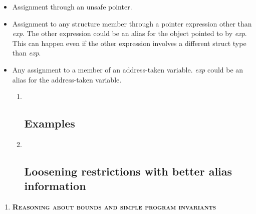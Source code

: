 \documentclass[]{article}
\begin{document}
\begin{itemize}
\item
  Assignment through an unsafe pointer.
\item
  Assignment to any structure member through a pointer expression other
  than \emph{exp}. The other expression could be an alias for the object
  pointed to by \emph{exp}. This can happen even if the other expression
  involves a different struct type than \emph{exp}.
\item
  Any assignment to a member of an address-taken variable. \emph{exp}
  could be an alias for the address-taken variable.

  \begin{enumerate}
  \def\labelenumi{\arabic{enumi}.}
  \item ~
    \subsection{\texorpdfstring{\protect\hypertarget{ux5fToc420589209}{}{\protect\hypertarget{ux5fToc422907000}{}{\protect\hypertarget{ux5fToc424307729}{}{\protect\hypertarget{ux5fToc426641106}{}{\protect\hypertarget{ux5fToc435434988}{}{\protect\hypertarget{ux5fToc437460821}{}{\protect\hypertarget{ux5fToc440445502}{}{\protect\hypertarget{ux5fToc440449284}{}{\protect\hypertarget{ux5fToc440551934}{}{}}}}}}}}}Examples}{Examples}}\label{examples-1}
  \item ~
    \subsection{\texorpdfstring{\protect\hypertarget{ux5fRef420578695}{}{\protect\hypertarget{ux5fToc420589210}{}{\protect\hypertarget{ux5fToc422907001}{}{\protect\hypertarget{ux5fToc424307730}{}{\protect\hypertarget{ux5fToc426641107}{}{\protect\hypertarget{ux5fToc435434989}{}{\protect\hypertarget{ux5fToc437460822}{}{\protect\hypertarget{ux5fToc440445503}{}{\protect\hypertarget{ux5fToc440449285}{}{\protect\hypertarget{ux5fToc440551935}{}{}}}}}}}}}}Loosening
    restrictions with better alias
    information}{Loosening restrictions with better alias information}}\label{loosening-restrictions-with-better-alias-information}
  \end{enumerate}
\end{itemize}

\begin{enumerate}
\def\labelenumi{\arabic{enumi}.}
\item
  \protect\hypertarget{ux5fToc424307717}{}{\protect\hypertarget{ux5fRef424909045}{}{\protect\hypertarget{ux5fRef424917446}{}{\protect\hypertarget{ux5fRef426461019}{}{\protect\hypertarget{ux5fRef426461647}{}{\protect\hypertarget{ux5fToc426641115}{}{\protect\hypertarget{ux5fToc435434990}{}{\protect\hypertarget{ux5fToc437460823}{}{\protect\hypertarget{ux5fRef440036087}{}{\protect\hypertarget{ux5fRef440382144}{}{\protect\hypertarget{ux5fToc440445504}{}{\protect\hypertarget{ux5fToc440449286}{}{\protect\hypertarget{ux5fToc440551936}{}{\protect\hypertarget{ux5fRef440617858}{}{}}}}}}}}}}}}}}\textbf{\textsc{Reasoning
  about bounds and simple program invariants}}
\end{enumerate}
\end{document}
